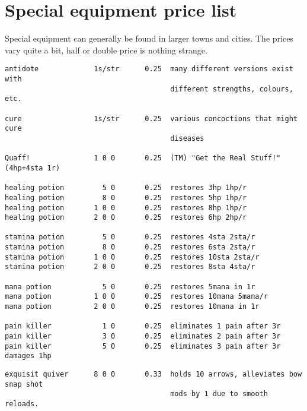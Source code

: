 
\goodbreak
{}
\section*{Special equipment price list}

Special equipment can generally be found in larger towns and cities.
The prices vary quite a bit, half or double price is nothing strange.

\small
\begin{verbatim}
antidote             1s/str      0.25  many different versions exist with
                                       different strengths, colours, etc.

cure                 1s/str      0.25  various concoctions that might cure
                                       diseases

Quaff!               1 0 0       0.25  (TM) "Get the Real Stuff!"  (4hp+4sta 1r)

healing potion         5 0       0.25  restores 3hp 1hp/r
healing potion         8 0       0.25  restores 5hp 1hp/r
healing potion       1 0 0       0.25  restores 8hp 1hp/r
healing potion       2 0 0       0.25  restores 6hp 2hp/r

stamina potion         5 0       0.25  restores 4sta 2sta/r
stamina potion         8 0       0.25  restores 6sta 2sta/r
stamina potion       1 0 0       0.25  restores 10sta 2sta/r
stamina potion       2 0 0       0.25  restores 8sta 4sta/r

mana potion            5 0       0.25  restores 5mana in 1r
mana potion          1 0 0       0.25  restores 10mana 5mana/r
mana potion          2 0 0       0.25  restores 10mana in 1r

pain killer            1 0       0.25  eliminates 1 pain after 3r
pain killer            3 0       0.25  eliminates 2 pain after 3r
pain killer            5 0       0.25  eliminates 3 pain after 3r damages 1hp

\end{verbatim} \goodbreak \begin{verbatim}
exquisit quiver      8 0 0       0.33  holds 10 arrows, alleviates bow snap shot
                                       mods by 1 due to smooth reloads.


\end{verbatim}
